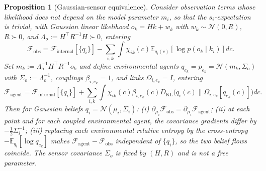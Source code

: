 \documentclass[11pt]{article}
\newtheorem{proposition}{Proposition}
\begin{document}
\begin{proposition}[Gaussian-sensor equivalence]\label{prop:gaussian_sensor_equivalence}
Consider observation terms whose likelihood does not depend on the model parameter $m_i$, so that the $s_i$-expectation is trivial, with Gaussian linear likelihood $o_k = H k + w_k$ with $w_k \sim \mathcal{N}(0, R)$, $R \succ 0$, and $\Lambda_o := H^\top R^{-1} H \succ 0$, entering
\begin{equation}
\mathcal{F}_{\text{obs}} = \mathcal{F}_{\text{internal}}[\{q_i\}] - \sum_{i,k} \int \chi_{ik}(c)  \mathbb{E}_{q_i(c)}[\log p(o_k\mid k_i)]  dc .
\end{equation}
Set $m_k := \Lambda_o^{-1} H^\top R^{-1} o_k$ and define environmental agents $q_{e_k} = p_{e_k} = \mathcal{N}(m_k, \Sigma_o)$ with $\Sigma_o := \Lambda_o^{-1}$, couplings $\beta_{i,e_k} = 1$, and links $\Omega_{i,e_k} = I$, entering
\begin{equation}
\mathcal{F}_{\text{agent}} = \mathcal{F}_{\text{internal}}[\{q_i\}] + \sum_{i,k} \int \chi_{ik}(c)  \beta_{i,e_k}(c)  D_{\mathrm{KL}}\big(q_i(c) \| \Omega_{i,e_k}[q_{e_k}(c)]\big)  dc .
\end{equation}
Then for Gaussian beliefs $q_i = \mathcal{N}(\mu_i, \Sigma_i)$: (i) $\partial_{\mu_i}\mathcal{F}_{\text{obs}} = \partial_{\mu_i}\mathcal{F}_{\text{agent}}$; (ii) at each point and for each coupled environmental agent, the covariance gradients differ by $-\tfrac{1}{2}\Sigma_i^{-1}$; (iii) replacing each environmental relative entropy by the cross-entropy $-\mathbb{E}_{q_i}[\log q_{e_k}]$ makes $\mathcal{F}_{\text{agent}} - \mathcal{F}_{\text{obs}}$ independent of $\{q_i\}$, so the two belief flows coincide. The sensor covariance $\Sigma_o$ is fixed by $(H, R)$ and is not a free parameter.
\end{proposition}
\end{document}
